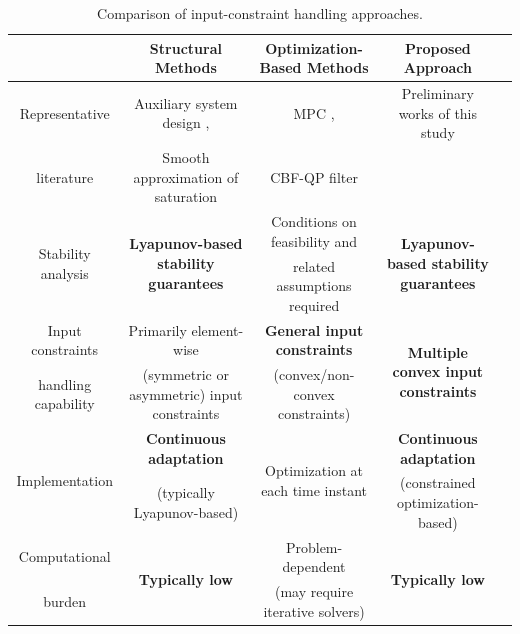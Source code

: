 \documentclass[letterpaper, journal]{IEEEtran}
\begin{document}
\begin{table}[t]
  \renewcommand{\arraystretch}{1.3}
  \caption{
    Comparison of input-constraint handling approaches.
  }
  \centering
  \begin{tabular}{c c c c c }
  \hline
  & 
  \textbf{Structural Methods} 
  & 
  \textbf{Optimization-Based Methods} 
  & 
  \textbf{Proposed Approach}
  \\
  \hline
  \hline %
    Representative 
  & 
  Auxiliary system design \cite{Gao:2017aa,Ma:2025aa,Gao:2026aa,Yang:2021aa,Jia:2020aa,Liu:2024aa,Liu:2025aa,Esfandiari:2014aa,Esfandiari:2015aa,Yu:2022aa,Rezaei:2025aa,He:2016aa,He:2019aa,Zhao:2016aa,Peng:2020aa},
  &
  MPC \cite{Greune:2011aa,Bemporad:1999aa,Berberich:2025aa,Draeger:1995aa,Vahidi-Moghaddam:2025aa,Mallick:2025aa,Khodaverdian:2025aa},
  &
  Preliminary works of this study
  \\
  literature
  &
  Smooth approximation of saturation \cite{Wang:2013aa,Cui:2014aa,Li:2024aa}
  &
  CBF-QP filter \cite{Ames:2019aa,Ko:2025aa,Sweatland:2025aa}
  &
  \cite{Ryu:2025ab,Ryu:2025aa}
  \\
  \hline %
  \multirow{2}{*}{
    Stability analysis 
  }
  & 
  \multirow{2}{*}{
    \textbf{Lyapunov-based stability guarantees}
  }
  & 
  Conditions on feasibility and
  & 
  \multirow{2}{*}{
    \textbf{Lyapunov-based stability guarantees}
  }
  \\
  &
  &
  related assumptions required
  &
  \\
  \hline %
  Input constraints 
  & 
  Primarily element-wise 
  & 
  \textbf{General input constraints}
  &
  \multirow{2}{*}{
  \textbf{Multiple convex input constraints}
  }
  \\
  handling capability
  &
  (symmetric or asymmetric) input constraints
  &
  (convex/non-convex constraints)
  &
  \\
  \hline %
  \multirow{2}{*}{
    Implementation
  }
  &
    \textbf{Continuous adaptation}
  &
  \multirow{2}{*}{
    Optimization at each time instant
  }
  &
    \textbf{Continuous adaptation}
  \\
  &
  (typically Lyapunov-based)
  &
  &
  (constrained optimization-based)
  \\
  \hline
    Computational
  &
  \multirow{2}{*}{
    \textbf{Typically low}
  }
  &
  Problem-dependent
  &
  \multirow{2}{*}{
    \textbf{Typically low}
  }
  \\
  burden
  &
  &
  (may require iterative solvers)
  &
  \\
  \hline
  \end{tabular}
  \label{table:intro:comparison}
\end{table}
\end{document}

